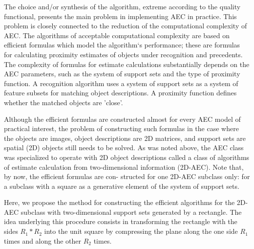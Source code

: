 The choice and/or synthesis of the algorithm, extreme according 
to the quality functional, presents the main problem in implementing 
AEC in practice. This problem is closely connected to the reduction 
of the computational complexity of AEC. The algorithms of acceptable 
computational complexity are based on efficient formulas which model 
the algorithm`s performance; these are formulas for calculating 
proximity estimates of objects under recognition and precedents. 
The complexity of formulas for estimate calculations substantially 
depends on the AEC parameters, such as the system of support 
sets and the type of proximity function. A recognition algorithm 
uses a system of support sets as a system of feature subsets 
for matching object descriptions. A proximity function defines 
whether the matched objects are 'close'. 
% 
% 
  
Although the efficient formulas are constructed almost for every 
AEC model of practical interest, the problem of constructing such 
formulas in the case where the objects are images, object 
descriptions are 2D matrices, and support sets are spatial (2D) 
objects still needs to be solved. As was noted above, the AEC 
class was specialized to operate with 2D object descriptions 
called a class of algorithms of estimate calculation from 
two-dimensional information (2D-AEC). Note that, by now, 
the efficient formulas are con- structed for one 2D-AEC subclass 
only: for a subclass with a square as a generative element of the 
system of support sets.

Here, we propose the method for constructing the efficient algorithms 
for the 2D-AEC subclass with two-dimensional support sets generated 
by a rectangle. The idea underlying this procedure consists in 
transforming the rectangle with the sides  $R_1*R_2$  into 
the unit square by compressing the plane along the one side  $R_1$  
times and along the other  $R_2$  times. 

